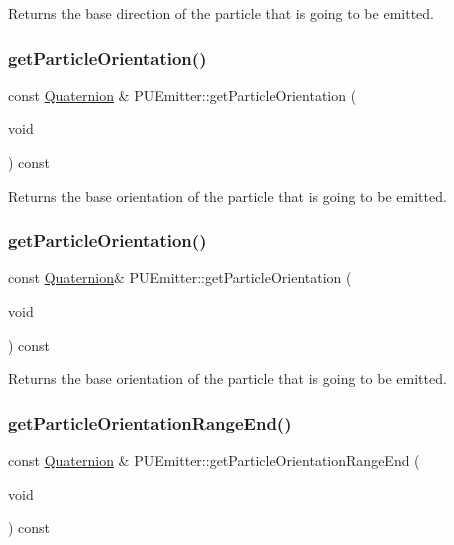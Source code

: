 Returns the base direction of the particle that is going to be emitted. \mbox{\label{classPUEmitter_aa0b58409ec93a9c859bce86313865582}} 
\subsubsection{\texorpdfstring{get\+Particle\+Orientation()}{getParticleOrientation()}\hspace{0.1cm}{\footnotesize\ttfamily [1/2]}}
{\footnotesize\ttfamily const \hyperlink{classQuaternion}{Quaternion} \& P\+U\+Emitter\+::get\+Particle\+Orientation (\begin{DoxyParamCaption}\item[{void}]{ }\end{DoxyParamCaption}) const}

Returns the base orientation of the particle that is going to be emitted. \mbox{\label{classPUEmitter_ad05c7389243abf1464e26062adf56223}} 
\subsubsection{\texorpdfstring{get\+Particle\+Orientation()}{getParticleOrientation()}\hspace{0.1cm}{\footnotesize\ttfamily [2/2]}}
{\footnotesize\ttfamily const \hyperlink{classQuaternion}{Quaternion}\& P\+U\+Emitter\+::get\+Particle\+Orientation (\begin{DoxyParamCaption}\item[{void}]{ }\end{DoxyParamCaption}) const}

Returns the base orientation of the particle that is going to be emitted. \mbox{\label{classPUEmitter_aa06b1807bea7964ff2221aacdac23f85}} 
\subsubsection{\texorpdfstring{get\+Particle\+Orientation\+Range\+End()}{getParticleOrientationRangeEnd()}\hspace{0.1cm}{\footnotesize\ttfamily [1/2]}}
{\footnotesize\ttfamily const \hyperlink{classQuaternion}{Quaternion} \& P\+U\+Emitter\+::get\+Particle\+Orientation\+Range\+End (\begin{DoxyParamCaption}\item[{void}]{ }\end{DoxyParamCaption}) const}

